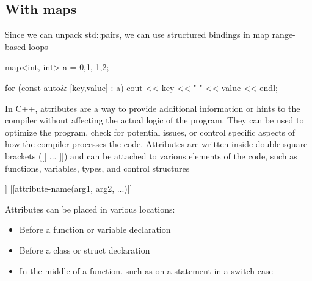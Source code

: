 \documentclass{report}
\begin{document}
    \bigbreak \noindent 
    \subsection{With maps}
    \bigbreak \noindent 
    Since we can unpack std::pairs, we can use structured bindings in map range-based loops
    \bigbreak \noindent 
    \begin{cppcode}
        map<int, int> a = {{0,1}, {1,2}};

        for (const auto& [key,value] : a) {
            cout << key << " " << value << endl;
        }
    \end{cppcode}

    \pagebreak 
    \bigbreak \noindent 
    In C++, attributes are a way to provide additional information or hints to the compiler without affecting the actual logic of the program. They can be used to optimize the program, check for potential issues, or control specific aspects of how the compiler processes the code. Attributes are written inside double square brackets ([[ ... ]]) and can be attached to various elements of the code, such as functions, variables, types, and control structures
    \bigbreak \noindent 
    \begin{cppcode}
        [[attribute-name]]
        [[attribute-name(arg1, arg2, ...)]]
    \end{cppcode}
    \bigbreak \noindent 
    Attributes can be placed in various locations:
    \begin{itemize}
        \item Before a function or variable declaration
        \item Before a class or struct declaration
        \item In the middle of a function, such as on a statement in a switch case
    \end{itemize}

    \bigbreak \noindent 
\end{document}
